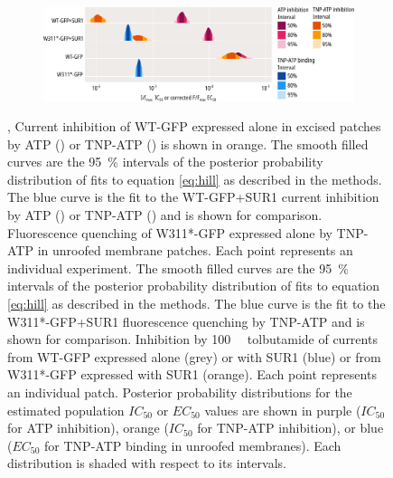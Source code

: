 \begin{figure}[h]
\begin{subfigure}[t]{0.9\textwidth}
		\centering
		\includegraphics[width=\textwidth]{nosur_ec50s.pdf}
	\end{subfigure}
	\caption[SUR1 dramatically alters inhibition but only subtly alters binding at Kir6.2]{
	,  Current inhibition of WT-GFP expressed alone in excised patches by ATP () or TNP-ATP () is shown in orange.
	The smooth filled curves are the \SI{95}{\percent} intervals of the posterior probability distribution of fits to equation \ref{eq:hill} as described in the methods.
	The blue curve is the fit to the WT-GFP+SUR1 current inhibition by ATP () or TNP-ATP () and is shown for comparison.
	 Fluorescence quenching of W311*-GFP expressed alone by TNP-ATP in unroofed membrane patches.
	Each point represents an individual experiment.
	The smooth filled curves are the \SI{95}{\percent} intervals of the posterior probability distribution of fits to equation \ref{eq:hill} as described in the methods.
	The blue curve is the fit to the W311*-GFP+SUR1 fluorescence quenching by TNP-ATP and is shown for comparison.
	 Inhibition by \SI{100}{\micro\Molar} tolbutamide of currents from WT-GFP expressed alone (grey) or with SUR1 (blue) or from W311*-GFP expressed with SUR1 (orange).
	Each point represents an individual patch.
	 Posterior probability distributions for the estimated population $IC_{50}$ or $EC_{50}$ values are shown in purple ($IC_{50}$ for ATP inhibition), orange ($IC_{50}$ for TNP-ATP inhibition), or blue ($EC_{50}$ for TNP-ATP binding in unroofed membranes).
	Each distribution is shaded with respect to its intervals.
	}\label{ch6fig:no_sur}
\end{figure}

